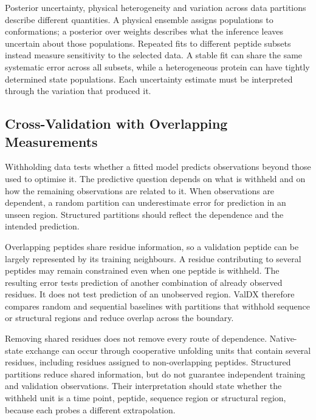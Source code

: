 Posterior uncertainty, physical heterogeneity and variation across data partitions describe different quantities. A physical ensemble assigns populations to conformations; a posterior over weights describes what the inference leaves uncertain about those populations.\supercite{bmsb2012ch12} Repeated fits to different peptide subsets instead measure sensitivity to the selected data. A stable fit can share the same systematic error across all subsets, while a heterogeneous protein can have tightly determined state populations. Each uncertainty estimate must be interpreted through the variation that produced it.

\subsection{Cross-Validation with Overlapping Measurements}
\label{sec:bg-cross-validation}

Withholding data tests whether a fitted model predicts observations beyond those used to optimise it. The predictive question depends on what is withheld and on how the remaining observations are related to it. When observations are dependent, a random partition can underestimate error for prediction in an unseen region. Structured partitions should reflect the dependence and the intended prediction.\supercite{robertsCrossvalidationStrategiesData2017}

Overlapping peptides share residue information, so a validation peptide can be largely represented by its training neighbours. A residue contributing to several peptides may remain constrained even when one peptide is withheld. The resulting error tests prediction of another combination of already observed residues. It does not test prediction of an unobserved region. ValDX therefore compares random and sequential baselines with partitions that withhold sequence or structural regions and reduce overlap across the boundary.\supercite{siddiquiFrameworkTestingStructural2026}

Removing shared residues does not remove every route of dependence. Native-state exchange can occur through cooperative unfolding units that contain several residues, including residues assigned to non-overlapping peptides.\supercite{englanderHydrogenExchangeModern1997} Structured partitions reduce shared information, but do not guarantee independent training and validation observations. Their interpretation should state whether the withheld unit is a time point, peptide, sequence region or structural region, because each probes a different extrapolation.

